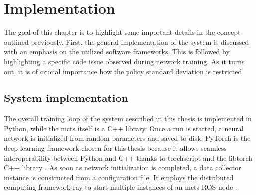 \glsresetall
\section{Implementation}
\label{sec:implementation}
The goal of this chapter is to highlight some important details in the concept outlined previously. First, the general implementation of the system is discussed with an emphasis on the utilized software frameworks. This is followed by highlighting a specific code issue observed during network training. As it turns out, it is of crucial importance how the policy standard deviation is restricted.

\subsection{System implementation}\label{ssec:system_implementation}
The overall training loop of the system described in this thesis is implemented in Python, while the \gls{mcts} itself is a C++ library. Once a run is started, a neural network is initialized from random parameters and saved to disk. PyTorch is the deep learning framework chosen for this thesis because it allows seamless interoperability between Python and C++ thanks to torchscript and the libtorch C++ library \cite{paszkePyTorchImperativeStyle}. As soon as network initialization is completed, a data collector instance is constructed from a configuration file. It employs the distributed computing framework ray \cite{moritzRayDistributedFramework2018} to start multiple instances of an \gls{mcts} ROS node \cite{quigleyROSOpensourceRobot}.

